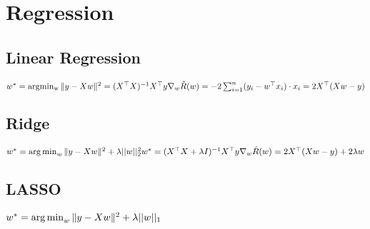 \section*{Regression}
\subsection*{Linear Regression}
$w^* = \operatorname{argmin_w} \|y - Xw\|^2=(X^\top X)^{-1} X^\top y\\
\nabla_w \hat{R}(w) = -2 \sum_{i=1}^n (y_i-w^\top x_i) \cdot x_i\\
= 2X^\top (Xw-y)$


\subsection*{Ridge}
$w^*=\operatorname*{arg\,min}_w \|y - Xw\|^2 + \lambda ||w||_2^2\\
w^*=(X^\top X + \lambda I)^{-1} X^\top y\\
\nabla_w \hat{R}(w) = 2X^\top (Xw-y) + 2\lambda w$

\subsection*{LASSO}
$w^*=\operatorname*{arg\,min}_w \|y - Xw\|^2 + \lambda ||w||_1$
\\